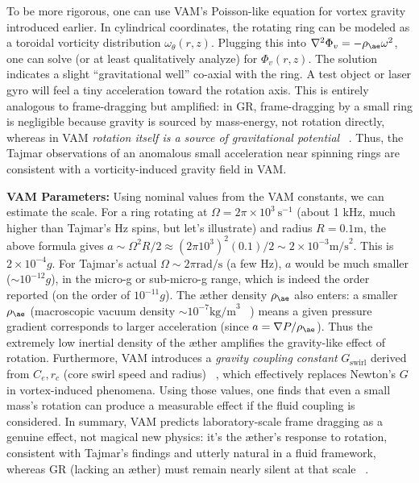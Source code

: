 \documentclass[a4paper, aps,preprint,superscriptaddress, 12pt]{revtex4}
\begin{document}
To be more rigorous, one can use VAM’s Poisson-like equation for vortex gravity introduced earlier. In cylindrical coordinates, the rotating ring can be modeled as a toroidal vorticity distribution $\omega_\theta(r,z)$. Plugging this into $\nabla^2\Phi_v = -\rho_{\ae}\omega^2$, one can solve (or at least qualitatively analyze) for $\Phi_v(r,z)$. The solution indicates a slight “gravitational well” co-axial with the ring. A test object or laser gyro will feel a tiny acceleration toward the rotation axis. This is entirely analogous to frame-dragging but amplified: in GR, frame-dragging by a small ring is negligible because gravity is sourced by mass-energy, not rotation directly, whereas in VAM \textit{rotation itself is a source of gravitational potential}~\cite{Iskandarani2025b} . Thus, the Tajmar observations of an anomalous small acceleration near spinning rings are consistent with a vorticity-induced gravity field in VAM.


\textbf{VAM Parameters:} Using nominal values from the VAM constants, we can estimate the scale. For a ring rotating at $\Omega = 2\pi\times10^3~\text{s}^{-1}$ (about 1 kHz, much higher than Tajmar’s Hz spins, but let’s illustrate) and radius $R=0.1\text{m}$, the above formula gives $a \sim \Omega^2 R /2 \approx (2\pi 10^3)^2(0.1)/2 \sim 2\times10^{-3}\text{m/s}^2$. This is $2\times10^{-4}g$. For Tajmar’s actual $\Omega \sim 2\pi\text{rad/s}$ (a few Hz), $a$ would be much smaller ($\sim10^{-12}g$), in the micro-g or sub-micro-g range, which is indeed the order reported (on the order of $10^{-11}g$). The æther density $\rho_{\ae}$ also enters: a smaller $\rho_{\ae}$ (macroscopic vacuum density $\sim10^{-7}\text{kg/m}^3$~\cite{VAM_constants} ) means a given pressure gradient corresponds to larger acceleration (since $a = \nabla P/\rho_{\ae}$). Thus the extremely low inertial density of the æther amplifies the gravity-like effect of rotation. Furthermore, VAM introduces a \textit{gravity coupling constant} $G_{\text{swirl}}$ derived from $C_e, r_c$ (core swirl speed and radius)~\cite{Iskandarani2025b} , which effectively replaces Newton’s $G$ in vortex-induced phenomena. Using those values, one finds that even a small mass’s rotation can produce a measurable effect if the fluid coupling is considered. In summary, VAM predicts laboratory-scale frame dragging as a genuine effect, not magical new physics: it’s the æther’s response to rotation, consistent with Tajmar’s findings and utterly natural in a fluid framework, whereas GR (lacking an æther) must remain nearly silent at that scale~\cite{Iskandarani2025b} .
\end{document}
